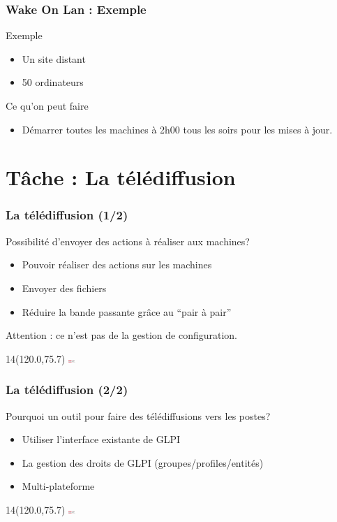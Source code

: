 \documentclass{beamer}
\newcommand{\WorkInProgress}{%
\begin{textblock}{14}(120.0,75.7)
\includegraphics[height=0.1cm]{./pics/logo_owf.png}
\end{textblock}
  }
\begin{document}
\begin{frame}
    \frametitle{Wake On Lan : Exemple}

    \begin{block}{Exemple}
    \begin{itemize}
    \item Un site distant
    \item 50 ordinateurs
    \end{itemize}
    \end{block}


    \begin{block}{Ce qu'on peut faire}
    \begin{itemize}
    \item Démarrer toutes les machines à 2h00 tous les soirs pour les mises à jour.
    \end{itemize}
    \end{block}

\end{frame}


\section{Tâche : La télédiffusion}

\begin{frame}
    \frametitle{La télédiffusion (1/2)}

    \begin{block}{Possibilité d'envoyer des actions à réaliser aux machines?}
    \begin{itemize}
        \item Pouvoir réaliser des actions sur les machines
        \item Envoyer des fichiers
        \item Réduire la bande passante grâce au “pair à pair”
    \end{itemize}
    Attention : ce n'est pas de la gestion de configuration.
    \end{block}

\WorkInProgress
\end{frame}

\begin{frame}
    \frametitle{La télédiffusion (2/2)}

    \begin{block}{Pourquoi un outil pour faire des télédiffusions vers les postes?}
    \begin{itemize}
        \item Utiliser l'interface existante de GLPI
        \item La gestion des droits de GLPI (groupes/profiles/entités)
        \item Multi-plateforme
    \end{itemize}
    \end{block}

\WorkInProgress
\end{frame}
\end{document}
